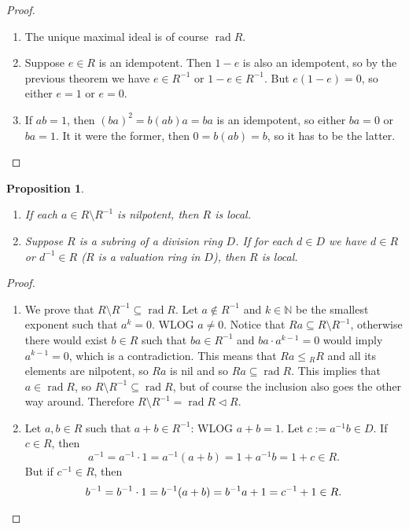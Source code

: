 \documentclass[10pt, a4paper]{article}
\newtheorem{proposition}[thm]{Proposition}
\newenvironment{noticeC}{%
  \tcolorbox[%
  notitle,
  empty,
  enhanced,  %
  breakable,
  coltext=black, 
  fontupper=\rmfamily,
  noparskip,
  sharp corners,
  boxrule=-1pt,  %
  frame hidden,
  left=7pt,  %
  right=7pt,
  top=5pt,
  bottom=5pt,
  before skip=2.5ex plus 2pt,
  after skip=2.5ex plus 2pt,
  overlay unbroken and last={%
  },
  ]}
{\endtcolorbox}
\newenvironment{myproof}%
  {\begin{noticeC}\begin{proof}}%
  {\end{proof}\end{noticeC}}
\newcommand{\N}{\mathbb {N}}
\DeclareMathOperator{\rad}{rad}
\begin{document}
\begin{myproof}
  \begin{enumerate}
    \item The unique maximal ideal is of course $\rad R$.
    \item Suppose $e \in R$ is an idempotent. Then $1 - e$ is also an idempotent,
    so by the previous theorem we have $e \in R^{-1}$ or $1 - e \in R^{-1}$.
    But $e (1 - e) = 0$, so either $e = 1$ or $e = 0$.
    \item If $ab = 1$, then $(ba)^2 = b(ab)a = ba$ is an idempotent, so either $ba = 0$ or $ba = 1$.
    It it were the former, then $0 = b(ab) = b$, so it has to be the latter.\qedhere
  \end{enumerate}
\end{myproof}

\begin{proposition}
  \begin{enumerate}
    \item If each $a \in {R} \setminus {R^{-1}}$ is nilpotent, then $R$ is local.
    \item Suppose $R$ is a subring of a division ring $D$.
    If for each $d \in D$ we have $d \in R$ or $d^{-1} \in R$ ($R$ is a valuation ring in $D$), then $R$ is local.
  \end{enumerate}
\end{proposition}

\begin{myproof}
  \begin{enumerate}
    \item We prove that $R \setminus R^{-1} \subseteq \rad R$. Let $a \notin R^{-1}$ and $k \in \N$ be the smallest exponent such that $a^k = 0$.
    WLOG $a \neq 0$. Notice that $Ra \subseteq R \setminus R^{-1}$, otherwise there would exist $b \in R$ such that $ba \in R^{-1}$ and $ba \cdot a^{k - 1} = 0$ would imply 
    $a^{k - 1} = 0$, which is a contradiction. This means that $Ra \leq {}_R R$ and all its elements are nilpotent, so $Ra$ is nil and so $Ra \subseteq \rad R$.
    This implies that $a \in \rad R$, so $R \setminus R^{-1} \subseteq \rad R$, but of course the inclusion also goes the other way around.
    Therefore $R \setminus R^{-1} = \rad R \lhd R$.
    \item Let $a, b \in R$ such that $a + b \in R^{-1}$: WLOG $a + b = 1$.
    Let $c := a^{-1}b \in D$. If $c \in R$, then 
    $$a^{-1} = a^{-1} \cdot 1 = a^{-1} (a + b) = 1 + a^{-1} b = 1 + c \in R.$$
    But if $c^{-1} \in R$, then
    \begin{equation*}
      b^{-1} = b^{-1} \cdot 1 = b^{-1} (a + b) = b^{-1}a + 1 = c^{-1} + 1 \in R. \qedhere   
    \end{equation*}
  \end{enumerate}
\end{myproof}
\end{document}
